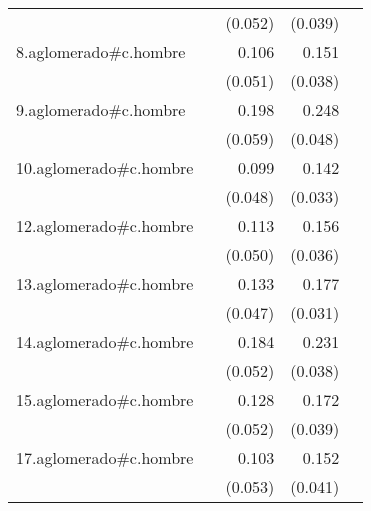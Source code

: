 {\begin{longtable}{l*{4}{D{.}{.}{-1}}}
            &                     &     (0.052)         &     (0.039)         &                     \\
\addlinespace
8.aglomerado#c.hombre&                     &       0.106\sym{*}  &       0.151\sym{***}&                     \\
            &                     &     (0.051)         &     (0.038)         &                     \\
\addlinespace
9.aglomerado#c.hombre&                     &       0.198\sym{***}&       0.248\sym{***}&                     \\
            &                     &     (0.059)         &     (0.048)         &                     \\
\addlinespace
10.aglomerado#c.hombre&                     &       0.099\sym{*}  &       0.142\sym{***}&                     \\
            &                     &     (0.048)         &     (0.033)         &                     \\
\addlinespace
12.aglomerado#c.hombre&                     &       0.113\sym{*}  &       0.156\sym{***}&                     \\
            &                     &     (0.050)         &     (0.036)         &                     \\
\addlinespace
13.aglomerado#c.hombre&                     &       0.133\sym{**} &       0.177\sym{***}&                     \\
            &                     &     (0.047)         &     (0.031)         &                     \\
\addlinespace
14.aglomerado#c.hombre&                     &       0.184\sym{***}&       0.231\sym{***}&                     \\
            &                     &     (0.052)         &     (0.038)         &                     \\
\addlinespace
15.aglomerado#c.hombre&                     &       0.128\sym{*}  &       0.172\sym{***}&                     \\
            &                     &     (0.052)         &     (0.039)         &                     \\
\addlinespace
17.aglomerado#c.hombre&                     &       0.103         &       0.152\sym{***}&                     \\
            &                     &     (0.053)         &     (0.041)         &                     \\

\end{longtable}}

